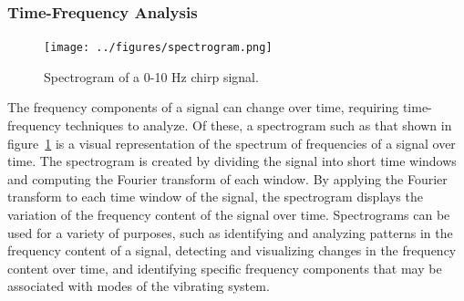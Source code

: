 \documentclass[12pt,letter]{article}
\begin{document}
\subsubsection{Time-Frequency Analysis}


\begin{figure}[H]
    \centering
    \texttt{[image: ../figures/spectrogram.png]}
    \caption{Spectrogram of a 0-10 Hz chirp signal.}
    \label{fig:spectrogram}
\end{figure}

The frequency components of a signal can change over time, requiring time-frequency techniques to analyze. Of these, a spectrogram such as that shown in figure~\ref{fig:spectrogram} is a visual representation of the spectrum of frequencies of a signal over time. The spectrogram is created by dividing the signal into short time windows and computing the Fourier transform of each window.  By applying the Fourier transform to each time window of the signal, the spectrogram displays the variation of the frequency content of the signal over time. Spectrograms can be used for a variety of purposes, such as identifying and analyzing patterns in the frequency content of a signal, detecting and visualizing changes in the frequency content over time, and identifying specific frequency components that may be associated with modes of the vibrating system.





\end{document}
